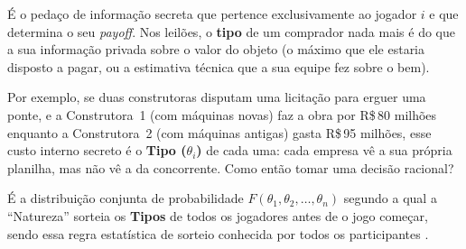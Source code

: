\begin{definicao}
\label{def:tipo_privado}
É o pedaço de informação secreta que pertence exclusivamente ao jogador $i$ e que determina o seu \textit{payoff}. Nos leilões, o \textbf{tipo} de um comprador nada mais é do que a sua informação privada sobre o valor do objeto (o máximo que ele estaria disposto a pagar, ou a estimativa técnica que a sua equipe fez sobre o bem).
\end{definicao}

Por exemplo, se duas construtoras disputam uma licitação para erguer uma ponte, e a Construtora~1 (com máquinas novas) faz a obra por R\$\,80 milhões enquanto a Construtora~2 (com máquinas antigas) gasta R\$\,95 milhões, esse custo interno secreto é o \textbf{Tipo ($\theta_i$)} de cada uma: cada empresa vê a sua própria planilha, mas não vê a da concorrente. Como então tomar uma decisão racional?

\begin{definicao}
\label{def:prior_comum}
É a distribuição conjunta de probabilidade $F(\theta_1, \theta_2, \dots, \theta_n)$ segundo a qual a ``Natureza'' sorteia os \textbf{Tipos} de todos os jogadores antes de o jogo começar, sendo essa regra estatística de sorteio conhecida por todos os participantes \cite{harsanyi1967,gibbons1992}.
\end{definicao}

